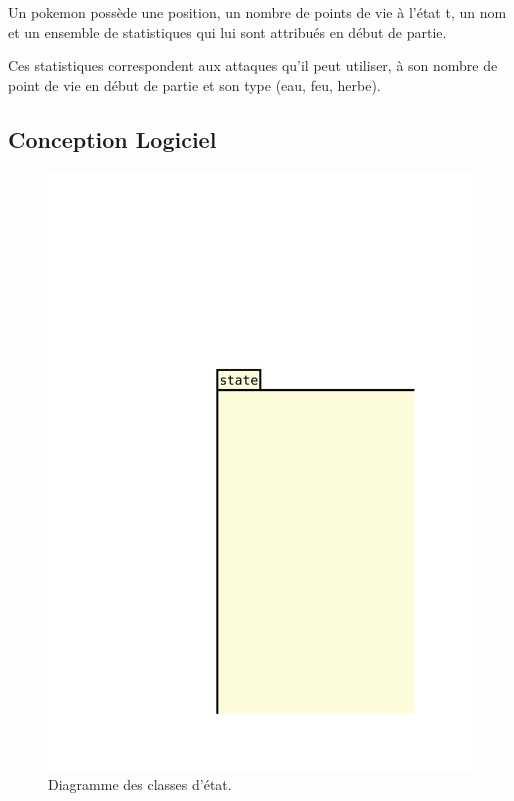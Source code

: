 \documentclass[a4paper,12pt]{article}
\begin{document}
    Un pokemon possède une position, un nombre de points de vie à l'état t, un nom et un ensemble de statistiques qui lui sont attribués en début de partie.

    Ces statistiques correspondent aux attaques qu'il peut utiliser, à son nombre de point de vie en début de partie et son type (eau, feu, herbe).
    \subsection{Conception Logiciel}



    \begin{landscape}
    \begin{figure}[p]
    \includegraphics[width=0.5\paperheight]{state.pdf}
    \caption{\label{uml:state}Diagramme des classes d'état.}
    \end{figure}
    \end{landscape}
\end{document}
